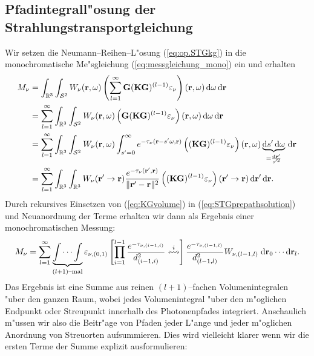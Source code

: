 	\subsection{Pfadintegrall"osung der Strahlungstransportgleichung}
	Wir setzen die Neumann--Reihen--L"osung (\ref{eq:op.STGkg}) in die monochromatische Me"sgleichung (\ref{eq:messgleichung_mono}) ein und erhalten
	\begin{align}
		M_\nu&=\int_{\mathbb{R}^3}\int_{\mathcal{S}^2}W_\nu(\mathbf{r},\omega) \left(\sum_{l=1}^\infty \mathbf{G} (\mathbf{KG})^{(l-1)} \varepsilon_\nu\right)(\mathbf{r},\omega) \,\text{d}\omega \,\text{d}\mathbf{r} \nonumber \\
		&=\sum_{l=1}^\infty \int_{\mathbb{R}^3}\int_{\mathcal{S}^2}W_\nu(\mathbf{r},\omega) \left(\mathbf{G} (\mathbf{KG})^{(l-1)} \varepsilon_\nu\right)(\mathbf{r},\omega) \,\text{d}\omega \,\text{d}\mathbf{r} \nonumber \\
		&=\sum_{l=1}^\infty \int_{\mathbb{R}^3}\int_{\mathcal{S}^2}W_\nu(\mathbf{r},\omega) \int_{s'=0}^\infty e^{-\tau_\nu(\mathbf{r}-s' \omega,\mathbf{r})} \left((\mathbf{KG})^{(l-1)} \varepsilon_\nu\right)(\mathbf{r},\omega) \underbrace{\text{d}s' \,\text{d}\omega}_{=\frac{\text{d}\mathbf{r}'}{s'^2}} \,\text{d}\mathbf{r} \nonumber \\
		&=\sum_{l=1}^\infty \int_{\mathbb{R}^3}\int_{\mathbb{R}^3}W_\nu(\mathbf{r}'\rightarrow\mathbf{r}) \frac{e^{-\tau_\nu(\mathbf{r}',\mathbf{r})}}{\|\mathbf{r}'-\mathbf{r}\|^2} \left((\mathbf{KG})^{(l-1)} \varepsilon_\nu\right)(\mathbf{r}'\rightarrow\mathbf{r}) \,\text{d}\mathbf{r}' \,\text{d}\mathbf{r}.
		\label{eq:STGprepathsolution}
	\end{align}
	Durch rekursives Einsetzen von (\ref{eq:KGvolume}) in (\ref{eq:STGprepathsolution}) und Neuanordnung der Terme erhalten wir dann als Ergebnis einer monochromatischen Messung:
	\begin{equation}
		M_\nu=\sum_{l=1}^\infty \underbrace{\idotsint}_{(l+1)\text{--mal}}\varepsilon_{\nu,(0,1)}\left[\prod_{i=1}^{l-1}\frac{e^{-\tau_{\nu,(i-1,i)}}}{d_{(i-1,i)}^2}\overset{i}{\leftrightsquigarrow}\right]\frac{e^{-\tau_{\nu,(l-1,l)}}}{d_{(l-1,l)}^2} W_{\nu,(l-1,l)} \;\text{d}\mathbf{r}_0 \dotsm \text{d}\mathbf{r}_l .
		\label{eq:STGpathsolution}
	\end{equation}
	Das Ergebnis ist eine Summe aus reinen $(l+1)$--fachen Volumenintegralen "uber den ganzen Raum, wobei jedes Volumenintegral "uber den m"oglichen Endpunkt oder Streupunkt innerhalb des Photonenpfades integriert.
	Anschaulich m"ussen wir also die Beitr"age von Pfaden jeder L"ange und jeder m"oglichen Anordnung von Streuorten aufsummieren. Dies wird vielleicht klarer wenn wir die ersten Terme der Summe explizit ausformulieren:
